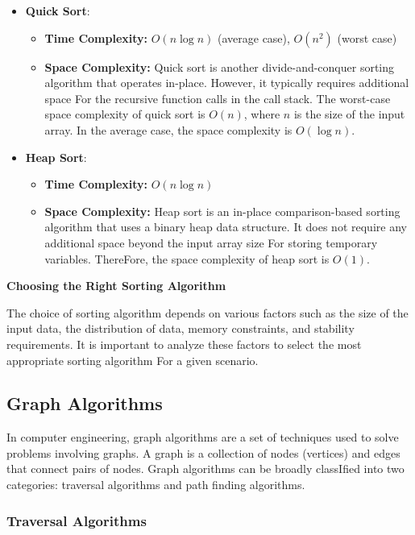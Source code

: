 \documentclass[12pt]{book} %
\begin{document}
\begin{itemize}
    
    \item \textbf{Quick Sort}: 
    \begin{itemize}
        \item \textbf{Time Complexity: }$O(n \log n)$ (average case), $O(n^2)$ (worst case)
        \item \textbf{Space Complexity: }Quick sort is another divide-and-conquer sorting algorithm that operates in-place. However, it typically requires additional space For the recursive function calls in the call stack. The worst-case space complexity of quick sort is \(O(n)\), where \(n\) is the size of the input array. In the average case, the space complexity is \(O(\log n)\).
        \end{itemize}
    \item \textbf{Heap Sort}:
    \begin{itemize}
        \item \textbf{Time Complexity: }$O(n \log n)$
        \item \textbf{Space Complexity: }Heap sort is an in-place comparison-based sorting algorithm that uses a binary heap data structure. It does not require any additional space beyond the input array size For storing temporary variables. ThereFore, the space complexity of heap sort is \(O(1)\).
        \end{itemize}
\end{itemize}
\FloatBarrier
\textbf{Choosing the Right Sorting Algorithm}

The choice of sorting algorithm depends on various factors such as the size of the input data, the distribution of data, memory constraints, and stability requirements. It is important to analyze these factors to select the most appropriate sorting algorithm For a given scenario.



\subsection{Graph Algorithms}
In computer engineering, graph algorithms are a set of techniques used to solve problems involving graphs. A graph is a collection of nodes (vertices) and edges that connect pairs of nodes. Graph algorithms can be broadly classIfied into two categories: traversal algorithms and path finding algorithms.

\subsubsection{Traversal Algorithms}
\end{document}
